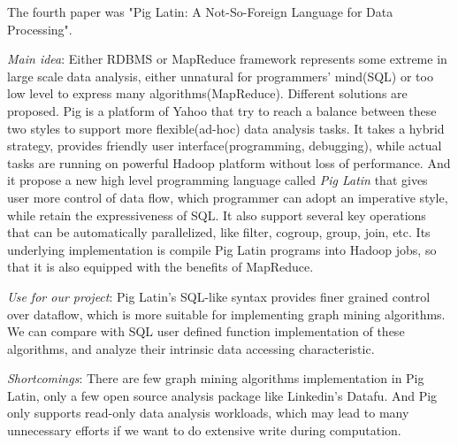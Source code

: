 The fourth paper was "Pig Latin: A Not-So-Foreign Language for Data Processing".
\cite{olston2008pig}
\begin{itemize*}
\item {\em Main idea}: 
    Either RDBMS or MapReduce framework represents some extreme in large scale data analysis, either unnatural for programmers' mind(SQL) or too low level to express many algorithms(MapReduce). Different solutions are proposed. Pig is a platform of Yahoo that try to reach a balance between these two styles to support more flexible(ad-hoc) data analysis tasks. It takes a hybrid strategy, provides friendly user interface(programming, debugging), while actual tasks are running on powerful Hadoop platform without loss of performance. And it propose a new high level programming language called \emph{Pig Latin} that gives user more control of data flow, which programmer can adopt an imperative style, while retain the expressiveness of SQL. It also support several key operations that can be automatically parallelized, like filter, cogroup, group, join, etc. Its underlying implementation is compile Pig Latin programs into Hadoop jobs, so that it is also equipped with the benefits of MapReduce. 
\item {\em Use for our project}:
    Pig Latin's SQL-like syntax provides finer grained control over dataflow, which is more suitable for implementing graph mining algorithms. We can compare with SQL user defined function implementation of these algorithms, and analyze their intrinsic data accessing characteristic.
\item {\em Shortcomings}:
    There are few graph mining algorithms implementation in Pig Latin, only a few open source analysis package like Linkedin's Datafu. And Pig only supports read-only data analysis workloads, which may lead to many unnecessary efforts if we want to do extensive write during computation.
\end{itemize*}
